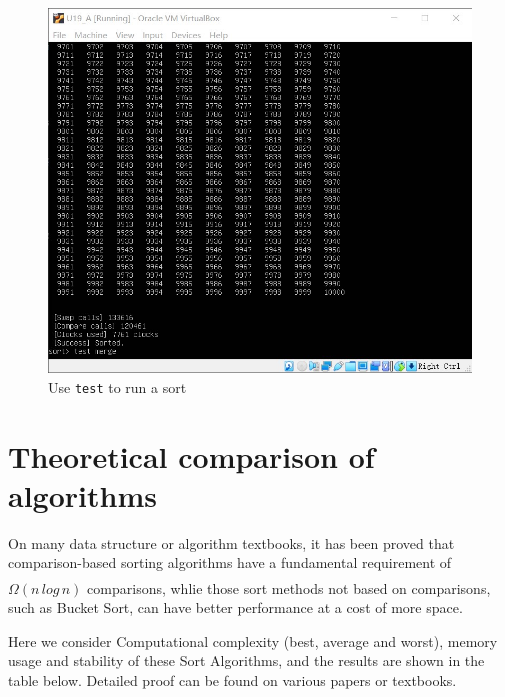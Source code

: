 \documentclass[cn,black,12pt,normal]{elegantnote}
\newcommand{\uct}[1]{\textsuperscript{\textsuperscript{\cite{#1}}}}
\begin{document}
\begin{figure}[H]
    \centering
    \includegraphics[width=0.7\linewidth]{image/sort_04.jpg}
    \caption{Use \lstinline{test} to run a sort}
\end{figure}

\section{Theoretical comparison of algorithms}

On many data structure or algorithm textbooks, it has been proved that comparison-based sorting algorithms have a fundamental requirement of $\Omega(n \, log \, n) $ comparisons,\uct{cormen2009introduction} whlie those sort methods not based on comparisons, such as Bucket Sort, can have better performance at a cost of more space.

Here we consider Computational complexity (best, average and worst), memory usage and stability of these Sort Algorithms, and the results are shown in the table below. Detailed proof can be found on various papers or textbooks.
\end{document}
